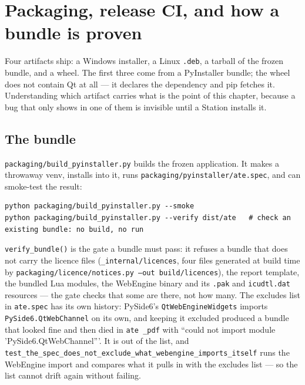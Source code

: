 \chapter{Packaging, release CI, and how a bundle is proven}\label{ch:packaging}

Four artifacts ship: a Windows installer, a Linux \texttt{.deb}, a tarball of the frozen bundle, and a
wheel. The first three come from a PyInstaller bundle; the wheel does not contain Qt at all --- it
declares the dependency and pip fetches it. Understanding which artifact carries what is the point of
this chapter, because a bug that only shows in one of them is invisible until a Station installs it.

\section{The bundle}

\texttt{packaging/\allowbreak{}build\_\allowbreak{}pyinstaller.py} builds the frozen application. It makes a throwaway venv,
installs into it, runs \texttt{packaging/\allowbreak{}pyinstaller/\allowbreak{}ate.spec}, and can smoke-test the result:

\begin{lstlisting}[language=ATEShell]
python packaging/build_pyinstaller.py --smoke
python packaging/build_pyinstaller.py --verify dist/ate   # check an existing bundle: no build, no run
\end{lstlisting}

\texttt{verify\_bundle()} is the gate a bundle must pass: it refuses a bundle that does not carry the
licence files (\texttt{\_internal/licences}, four files generated at build time by
\texttt{packaging/\allowbreak{}licence/\allowbreak{}notices.py --out build/\allowbreak{}licences}), the report template, the bundled Lua
modules, the WebEngine binary and its \texttt{.pak} and \texttt{icudtl.dat} resources --- the gate
checks that some are there, not how many. The excludes list in \texttt{ate.spec}
has its own history: PySide6's \texttt{QtWebEngineWidgets} imports \texttt{PySide6.QtWebChannel} on its
own, and keeping it excluded produced a bundle that looked fine and then died in
\texttt{ate \_pdf} with ``could not import module 'PySide6.QtWebChannel'''. It is out of the list, and
\texttt{test\_\allowbreak{}the\_\allowbreak{}spec\_\allowbreak{}does\_\allowbreak{}not\_\allowbreak{}exclude\_\allowbreak{}what\_\allowbreak{}webengine\_\allowbreak{}imports\_\allowbreak{}itself} runs the WebEngine import and
compares what it pulls in with the excludes list --- so the list cannot drift again without failing.

